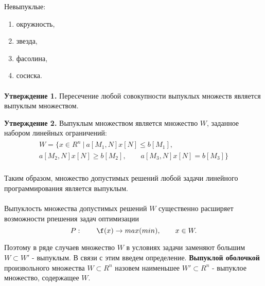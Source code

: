\documentclass[14pt, letterpaper]{article}
\begin{document}
Невыпуклые:
\begin{enumerate}
    \item окружность,
    \item звезда,
    \item фасолина, 
    \item сосиска.
\end{enumerate}

\paragraph{}
\textbf{Утверждение 1.} Пересечение любой совокупности выпуклых множеств является выпуклым множеством.

\textbf{Утверждение 2.} Выпуклым множеством является множество $W$, заданное набором линейных ограничений:
\begin{displaymath}
   	\begin{split}
   		\begin{aligned}
   			W = \{ x \in R^{n}\: | \: a[M_{1},N]x[N] \leq b[M_{1}], \\ a[M_{2},N]x[N] \geq b[M_{2}], \qquad a[M_{3},N]x[N] = b[M_{3}] \}
   		\end{aligned}
   	\end{split}
   \end{displaymath}
\paragraph{}
Таким образом, множество допустимых решений любой задачи линейного программирования является выпуклым.

\paragraph{}
Выпуклость множества допустимых решений $W$ существенно расширяет возможности рпешения задач оптимизации
    $$P: \qquad \f(x) \rightarrow max(min), \qquad x \in W.$$

Поэтому в ряде случаев множество $W$ в условиях задачи заменяют большим $W \subset W\prime$ - выпуклым. В связи с этим введем определение. \textbf{Выпуклой оболочкой} произвольного множества $W \subset R^{n}$ назовем наименьшее $W\prime \subset R^{n}$ - выпуклое множество, содержащее $W$.

\paragraph{}
\end{document}
